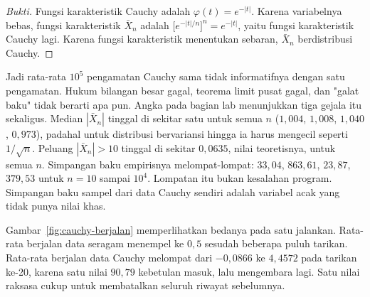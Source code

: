 \begin{proof}[Bukti]
Fungsi karakteristik Cauchy adalah $\varphi(t)=e^{-|t|}$. Karena variabelnya
bebas, fungsi karakteristik $\bar X_n$ adalah
$\bigl[e^{-|t|/n}\bigr]^n=e^{-|t|}$, yaitu fungsi karakteristik Cauchy lagi.
Karena fungsi karakteristik menentukan sebaran, $\bar X_n$ berdistribusi Cauchy.
\end{proof}

Jadi rata-rata $10^5$ pengamatan Cauchy sama tidak informatifnya dengan satu
pengamatan. Hukum bilangan besar gagal, teorema limit pusat gagal, dan "galat
baku" tidak berarti apa pun. Angka pada bagian lab menunjukkan tiga gejala itu
sekaligus. Median $|\bar X_n|$ tinggal di sekitar satu untuk semua $n$
($1{,}004$, $1{,}008$, $1{,}040$, $0{,}973$), padahal untuk distribusi
bervariansi hingga ia harus mengecil seperti $1/\sqrt n$. Peluang
$|\bar X_n|>10$ tinggal di sekitar $0{,}0635$, nilai teoretisnya, untuk semua $n$.
Simpangan baku empirisnya melompat-lompat: $33{,}04$, $863{,}61$, $23{,}87$,
$379{,}53$ untuk $n=10$ sampai $10^4$. Lompatan itu bukan kesalahan program.
Simpangan baku sampel dari data Cauchy sendiri adalah variabel acak yang tidak
punya nilai khas.

Gambar~\ref{fig:cauchy-berjalan} memperlihatkan bedanya pada satu jalankan.
Rata-rata berjalan data seragam menempel ke $0{,}5$ sesudah beberapa puluh
tarikan. Rata-rata berjalan data Cauchy melompat dari $-0{,}0866$ ke $4{,}4572$
pada tarikan ke-20, karena satu nilai $90{,}79$ kebetulan masuk, lalu mengembara
lagi. Satu nilai raksasa cukup untuk membatalkan seluruh riwayat sebelumnya.

